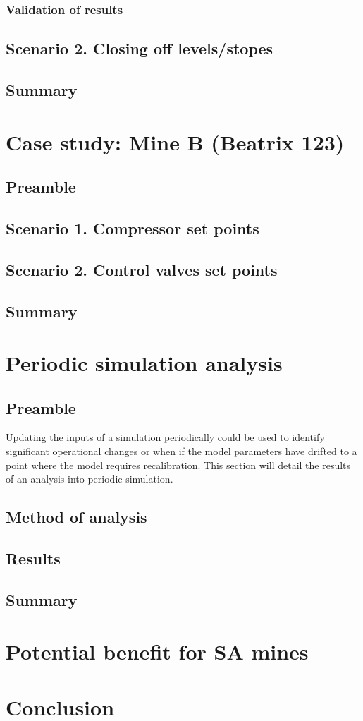 	
	\subsubsection{Validation of results}
	\subsection{Scenario 2. Closing off levels/stopes}
	\subsection{Summary}
\section{Case study: Mine B \color{blue}(Beatrix 123)}
	\subsection{Preamble}
	\subsection{Scenario 1. Compressor set points}
	\subsection{Scenario 2. Control valves set points}
	\subsection{Summary}
\section{Periodic simulation analysis}
	\subsection{Preamble}
	 Updating the inputs of a simulation periodically could be used to identify significant operational changes or when if the model parameters have drifted to a point where the model requires recalibration. This section will detail the results of an analysis into periodic simulation.
	 \subsection{Method of analysis}
	 
	 \subsection{Results}
	\subsection{Summary}
\section{Potential benefit for SA mines}
\section{Conclusion}